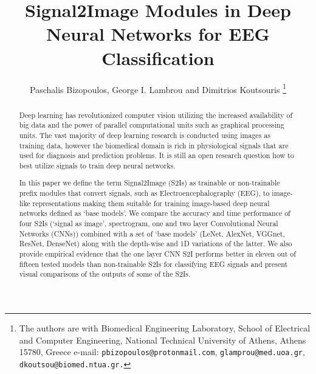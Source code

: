 \documentclass[conference]{IEEEtran}
\begin{document}
\title{Signal2Image Modules in Deep Neural Networks for EEG Classification}
\author{Paschalis Bizopoulos, George I. Lambrou and Dimitrios Koutsouris%
\thanks{The authors are with Biomedical Engineering Laboratory, School of Electrical and Computer Engineering, National Technical University of Athens, Athens 15780, Greece e-mail: {\tt\small pbizopoulos@protonmail.com}, {\tt\small glamprou@med.uoa.gr}, {\tt\small dkoutsou@biomed.ntua.gr.}}
}

\maketitle

\begin{abstract}
	Deep learning has revolutionized computer vision utilizing the increased availability of big data and the power of parallel computational units such as graphical processing units.
	The vast majority of deep learning research is conducted using images as training data, however the biomedical domain is rich in physiological signals that are used for diagnosis and prediction problems.
	It is still an open research question how to best utilize signals to train deep neural networks.

	In this paper we define the term Signal2Image (S2Is) as trainable or non-trainable prefix modules that convert signals, such as Electroencephalography (EEG), to image-like representations making them suitable for training image-based deep neural networks defined as `base models'.
	We compare the accuracy and time performance of four S2Is (`signal as image', spectrogram, one and two layer Convolutional Neural Networks (CNNs)) combined with a set of `base models' (LeNet, AlexNet, VGGnet, ResNet, DenseNet) along with the depth-wise and 1D variations of the latter.
	We also provide empirical evidence that the one layer CNN S2I performs better in eleven out of fifteen tested models than non-trainable S2Is for classifying EEG signals and present visual comparisons of the outputs of some of the S2Is.
\end{abstract}
\end{document}
